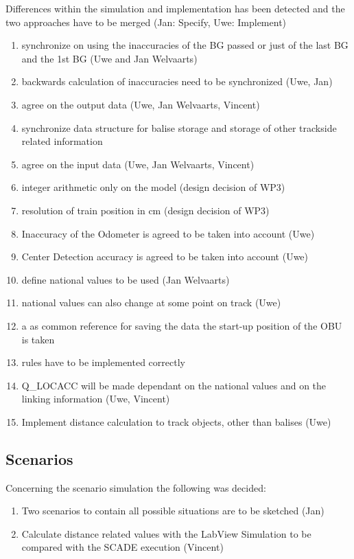 \documentclass{article}
\begin{document}
Differences within the simulation and implementation has been detected
and the two approaches have to be merged (Jan: Specify, Uwe: Implement)
\begin{enumerate}
\item synchronize on using the inaccuracies of the BG passed or just of the last BG and the 1st BG (Uwe and Jan Welvaarts)
\item backwards calculation of inaccuracies need to be synchronized (Uwe, Jan)
\item agree on the output data (Uwe, Jan Welvaarts, Vincent)
\item synchronize data structure for balise storage and storage of other trackside related information
\item agree on the input data (Uwe, Jan Welvaarts, Vincent)
\item integer arithmetic only on the model (design decision of WP3)
\item resolution of train position in cm (design decision of WP3)
\item Inaccuracy of the Odometer is agreed to be taken into account (Uwe)
\item Center Detection accuracy is agreed to be taken into account (Uwe)
\item define national values to be used (Jan Welvaarts)
\item national values can also change at some point on track (Uwe)
\item a as common reference for saving the data the start-up position of the OBU is taken
\item rules have to be implemented correctly
\item  Q\_LOCACC will be made dependant on the national values and on the linking information (Uwe, Vincent)
\item  Implement distance calculation to track objects, other than balises (Uwe)
\end{enumerate}

\subsection{Scenarios}

Concerning the scenario simulation the following was decided:
\begin{enumerate}
\item Two scenarios to contain all possible situations are to be sketched (Jan)
\item Calculate distance related values with the LabView Simulation to be compared with the SCADE execution (Vincent)
\end{enumerate}
\end{document}
